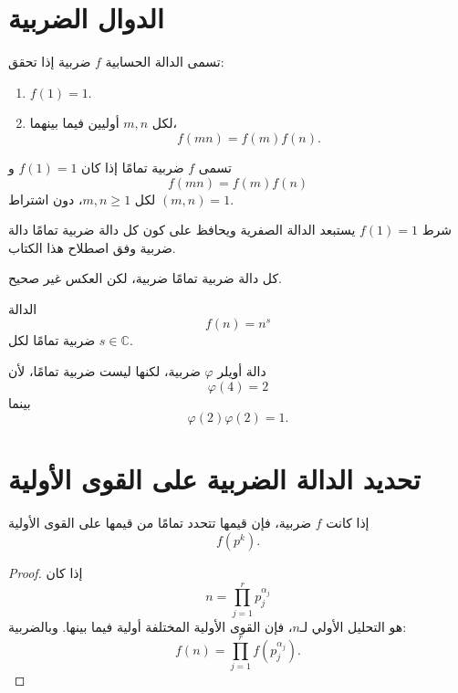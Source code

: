 \section{الدوال الضربية}

\begin{definition}
تسمى الدالة الحسابية \(f\) ضربية إذا تحقق:

\begin{enumerate}
  \item \(f(1)=1\).
  \item لكل \(m,n\) أوليين فيما بينهما،
  \[
  f(mn)=f(m)f(n).
  \]
\end{enumerate}
\end{definition}

\begin{definition}
تسمى \(f\) ضربية تمامًا إذا كان \(f(1)=1\) و
\[
f(mn)=f(m)f(n)
\]
لكل \(m,n\geq1\)، دون اشتراط \((m,n)=1\).
\end{definition}

شرط \(f(1)=1\) يستبعد الدالة الصفرية ويحافظ على كون كل دالة ضربية
تمامًا دالة ضربية وفق اصطلاح هذا الكتاب.

كل دالة ضربية تمامًا ضربية، لكن العكس غير صحيح.

\begin{example}
الدالة
\[
f(n)=n^s
\]
ضربية تمامًا لكل \(s\in\mathbb{C}\).
\end{example}

\begin{example}
دالة أويلر \(\varphi\) ضربية، لكنها ليست ضربية تمامًا، لأن
\[
\varphi(4)=2
\]
بينما
\[
\varphi(2)\varphi(2)=1.
\]
\end{example}

\section{تحديد الدالة الضربية على القوى الأولية}

\begin{theorem}
\label{thm:multiplicative-function-prime-powers}
\provedhere
إذا كانت \(f\) ضربية، فإن قيمها تتحدد تمامًا من قيمها على القوى الأولية
\[
f(p^k).
\]
\end{theorem}

\begin{proof}
إذا كان
\[
n=\prod_{j=1}^{r}p_j^{\alpha_j}
\]
هو التحليل الأولي لـ\(n\)، فإن القوى الأولية المختلفة أولية فيما بينها. وبالضربية:
\[
f(n)
=
\prod_{j=1}^{r}f(p_j^{\alpha_j}).
\]
\end{proof}

